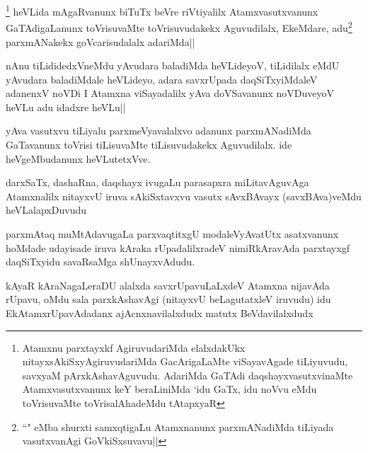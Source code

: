 
\begin{artha}
\footnote[1]{Atamxnu parxtayxkf AgiruvudariMda elalxdakUkx nitayxsAkiSxyAgiruvudariMda GacArigaLaMte viSayavAgade tiLiyuvudu, savxyaM pArxkAshavAguvudu. AdariMda GaTAdi daqshayxvasutxvinaMte Atamxvasutxvanunx keY beraLiniMda `idu GaTx, idu noVvu eMdu toVrisuvaMte toVrisalAhadeMdu tAtapxyaR} heVLida mAgaRvanunx biTuTx beVre riVtiyalilx Atamxvasutxvanunx GaTAdigaLanunx toVrisuvaMte toVrisuvudakekx Aguvudilalx, EkeMdare, adu\footnote[2]{``\stext " eMba shurxti samxqtigaLu Atamxnanunx parxmANadiMda tiLiyada vasutxvanAgi GoVkiSxsuvavu||} parxmANakekx goVcarisudalalx adariMda||
\end{artha}

\begin{artha}
nAnu tiLididedxVneMdu yAvudara baladiMda heVLideyoV, tiLidilalx eMdU yAvudara baladiMdale heVLideyo, adara savxrUpada daqSiTxyiMdaleV adanenxV noVDi I Atamxna viSayadalilx yAva doVSavanunx noVDuveyoV heVLu adu idadxre heVLu||
\end{artha}%


\begin{artha}
yAva vasutxvu tiLiyalu parxmeVyavalalxvo adanunx parxmANadiMda GaTavanunx toVrisi tiLisuvaMte tiLisuvudakekx Aguvudilalx. ide heVgeMbudanunx heVLutetxVve.
\end{artha}


\begin{artha}
darxSaTx, dashaRna, daqshayx ivugaLu parasapxra miLitavAguvAga Atamxnalilx nitayxvU iruva sAkiSxtavxvu vasutx sAvxBAvayx (savxBAva)veMdu heVLalapxDuvudu
\end{artha}

\begin{artha}
parxmAtaq muMtAdavugaLa parxvaqtitxgU modaleVyAvatUtx asatxvanunx hoMdade udayisade iruva kAraka rUpadalilxradeV nimiRkAravAda parxtayxgf daqSiTxyidu savaRsaMga shUnayxvAdudu.
\end{artha}

\begin{artha}
kAyaR kAraNagaLeraDU alalxda savxrUpavuLaLxdeV Atamxna nijavAda rUpavu, oMdu sala parxkAshavAgi (nitayxvU beLagutatxleV iruvudu) idu EkAtamxrUpavAdadanx ajAcnxnavilalxdudx matutx BeVdavilalxdudx
\end{artha}

